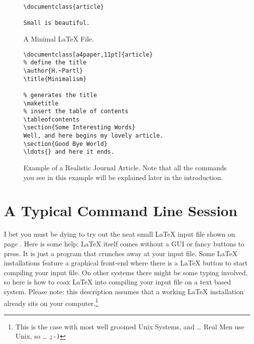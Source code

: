 \begin{figure}[!bp]
\begin{lined}{6cm}
\begin{verbatim}
\documentclass{article}

Small is beautiful.

\end{verbatim}
\end{lined}
\caption{A Minimal \LaTeX{} File.} \label{mini}
\end{figure}
 
\begin{figure}[!bp]
\begin{lined}{10cm}
\begin{verbatim}
\documentclass[a4paper,11pt]{article}
% define the title
\author{H.~Partl}
\title{Minimalism}

% generates the title
\maketitle 
% insert the table of contents
\tableofcontents
\section{Some Interesting Words}
Well, and here begins my lovely article.
\section{Good Bye World}
\ldots{} and here it ends.

\end{verbatim}
\end{lined}
\caption[Example of a Realistic Journal Article.]{Example of a Realistic
Journal Article. Note that all the commands you see in this example will be
explained later in the introduction.} \label{document}

\end{figure}

\section{A Typical Command Line Session}

I bet you must be dying to try out the neat small \LaTeX{} input file
shown on page \pageref{mini}. Here is some help:
\LaTeX{} itself comes without a GUI or
fancy buttons to press. It is just a program that crunches away at your
input file. Some \LaTeX{} installations feature a graphical front-end where
there is a \LaTeX{} button to start compiling your input file. On other systems
there might be some typing involved, so here is how to coax \LaTeX{} into
compiling your input file on a text based system. Please note: this
description assumes that a working \LaTeX{} installation already sits on
your computer.\footnote{This is the case with most well groomed Unix
Systems, and \ldots{} Real Men use Unix, so \ldots{} \texttt{;-)}}

